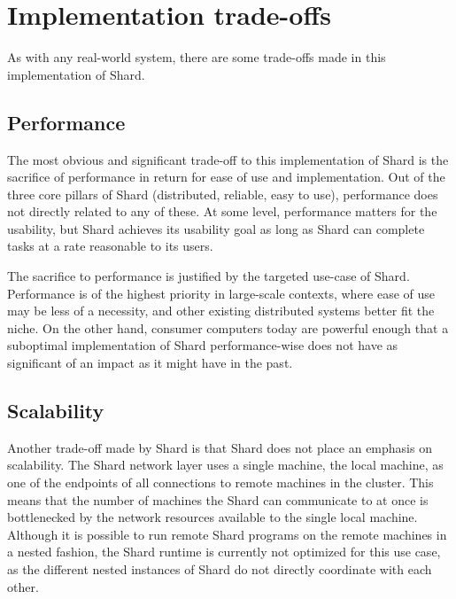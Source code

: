 \documentclass[oneside]{report}
\newcommand{\todoi}[1]{\todo[inline, color=blue!20]{TODO: {#1}}}
\begin{document}
\section{Implementation trade-offs}

As with any real-world system, there are some trade-offs made in this implementation of Shard.

\subsection{Performance}

The most obvious and significant trade-off to this implementation of Shard is the sacrifice of performance in return for ease of use and implementation.
Out of the three core pillars of Shard (distributed, reliable, easy to use), performance does not directly related to any of these.
At some level, performance matters for the usability, but Shard achieves its usability goal as long as Shard can complete tasks at a rate reasonable to its users.

The sacrifice to performance is justified by the targeted use-case of Shard.
Performance is of the highest priority in large-scale contexts, where ease of use may be less of a necessity, and other existing distributed systems better fit the niche.
On the other hand, consumer computers today are powerful enough that a suboptimal implementation of Shard performance-wise does not have as significant of an impact as it might have in the past.

\subsection{Scalability}
Another trade-off made by Shard is that Shard does not place an emphasis on scalability.
The Shard network layer uses a single machine, the local machine, as one of the endpoints of all connections to remote machines in the cluster.
This means that the number of machines the Shard can communicate to at once is bottlenecked by the network resources available to the single local machine.
Although it is possible to run remote Shard programs on the remote machines in a nested fashion, the Shard runtime is currently not optimized for this use case, as the different nested instances of Shard do not directly coordinate with each other.
\end{document}
